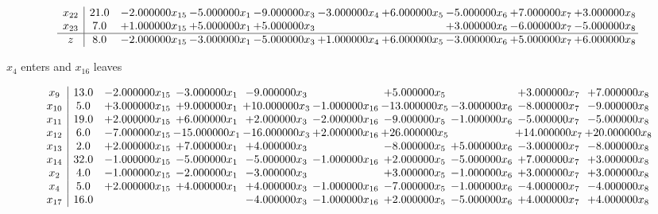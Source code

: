 \documentclass[10pt]{article}
\begin{document}
\[\begin{array}{c| c c@{\hskip 2pt} c@{\hskip 2pt} c@{\hskip 2pt} c@{\hskip 2pt} c@{\hskip 2pt} c@{\hskip 2pt} c@{\hskip 2pt} c@{\hskip 2pt} }
 x_{22}   &  21.0 & -2.000000 x_{15} & -5.000000 x_{1} & -9.000000 x_{3} & -3.000000 x_{4} & + 6.000000 x_{5} & -5.000000 x_{6} & + 7.000000 x_{7} & + 3.000000 x_{8}\\
 x_{23}   &  7.0 & + 1.000000 x_{15} & + 5.000000 x_{1} & + 5.000000 x_{3} &    &   & + 3.000000 x_{6} & -6.000000 x_{7} & -5.000000 x_{8}\\
\hline
z    &  8.0 & -2.000000 x_{15} & -3.000000 x_{1} & -5.000000 x_{3} & + 1.000000 x_{4} & + 6.000000 x_{5} & -3.000000 x_{6} & + 5.000000 x_{7} & + 6.000000 x_{8}\\
\end{array}\]


 $ x_{4} $ enters and $ x_{16} $ leaves 

 \[\begin{array}{c| c c@{\hskip 2pt} c@{\hskip 2pt} c@{\hskip 2pt} c@{\hskip 2pt} c@{\hskip 2pt} c@{\hskip 2pt} c@{\hskip 2pt} c@{\hskip 2pt} }
 x_{9}   &  13.0 & -2.000000 x_{15} & -3.000000 x_{1} & -9.000000 x_{3} &   & + 5.000000 x_{5} &   & + 3.000000 x_{7} & + 7.000000 x_{8}\\
 x_{10}   &  5.0 & + 3.000000 x_{15} & + 9.000000 x_{1} & + 10.000000 x_{3} & -1.000000 x_{16} & -13.000000 x_{5} & -3.000000 x_{6} & -8.000000 x_{7} & -9.000000 x_{8}\\
 x_{11}   &  19.0 & + 2.000000 x_{15} & + 6.000000 x_{1} & + 2.000000 x_{3} & -2.000000 x_{16} & -9.000000 x_{5} & -1.000000 x_{6} & -5.000000 x_{7} & -5.000000 x_{8}\\
 x_{12}   &  6.0 & -7.000000 x_{15} & -15.000000 x_{1} & -16.000000 x_{3} & + 2.000000 x_{16} & + 26.000000 x_{5} &   & + 14.000000 x_{7} & + 20.000000 x_{8}\\
 x_{13}   &  2.0 & + 2.000000 x_{15} & + 7.000000 x_{1} & + 4.000000 x_{3} &   & -8.000000 x_{5} & + 5.000000 x_{6} & -3.000000 x_{7} & -8.000000 x_{8}\\
 x_{14}   &  32.0 & -1.000000 x_{15} & -5.000000 x_{1} & -5.000000 x_{3} & -1.000000 x_{16} & + 2.000000 x_{5} & -5.000000 x_{6} & + 7.000000 x_{7} & + 3.000000 x_{8}\\
 x_{2}   &  4.0 & -1.000000 x_{15} & -2.000000 x_{1} & -3.000000 x_{3} &   & + 3.000000 x_{5} & -1.000000 x_{6} & + 3.000000 x_{7} & + 3.000000 x_{8}\\
 x_{4}   &  5.0 & + 2.000000 x_{15} & + 4.000000 x_{1} & + 4.000000 x_{3} & -1.000000 x_{16} & -7.000000 x_{5} & -1.000000 x_{6} & -4.000000 x_{7} & -4.000000 x_{8}\\
 x_{17}   &  16.0  &    &   & -4.000000 x_{3} & -1.000000 x_{16} & + 2.000000 x_{5} & -5.000000 x_{6} & + 4.000000 x_{7} & + 4.000000 x_{8}\\

\end{array}\]
\end{document}
